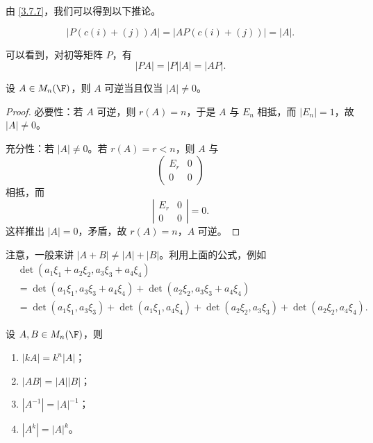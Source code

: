 由 \ref{3.7.7}，我们可以得到以下推论。

\begin{corollary}\label{3.7.8}
	\[
	|P(c(i)+(j))A|=|AP(c(i)+(j))|=|A|.
	\]
\end{corollary}

可以看到，对初等矩阵 $P$，有
\[
|PA|=|P||A|=|AP|.
\]

\begin{theorem}\label{3.7.9}
	设 $A\in M_n(\F)$，则 $A$ 可逆当且仅当 $|A|\neq0$。
\end{theorem}

\begin{proof}
	必要性：若 $A$ 可逆，则 $r(A)=n$，于是 $A$ 与 $E_n$ 相抵，而 $|E_n|=1$，故 $|A|\neq0$。
	
	充分性：若 $|A|\neq0$。若 $r(A)=r<n$，则 $A$ 与
	\[
	\begin{pmatrix}
		E_r&0\\
		0&0
	\end{pmatrix}
	\]
	相抵，而
	\[
	\left|
	\begin{matrix}
		E_r&0\\
		0&0
	\end{matrix}
	\right|=0.
	\]
	这样推出 $|A|=0$，矛盾，故 $r(A)=n$，$A$ 可逆。
\end{proof}

注意，一般来讲 $|A+B|\neq |A|+|B|$。利用上面的公式，例如
\[
\begin{aligned}
	&\det(a_1\xi_1+a_2\xi_2,
	a_3\xi_3+a_4\xi_4)\\
	&=\det(a_1\xi_1,
	a_3\xi_3+a_4\xi_4)
	+\det(a_2\xi_2,
	a_3\xi_3+a_4\xi_4)\\
	&=\det(a_1\xi_1,a_3\xi_3)
	+\det(a_1\xi_1,a_4\xi_4)
	+\det(a_2\xi_2,a_3\xi_3)
	+\det(a_2\xi_2,a_4\xi_4).
\end{aligned}
\]

\begin{proposition}\label{3.7.10}
	设 $A,B\in M_n(\F)$，则
	\begin{enumerate}
		\item $|kA|=k^n|A|$；
		\item $|AB|=|A||B|$；
		\item $|A^{-1}|=|A|^{-1}$；
		\item $|A^k|=|A|^k$。
	\end{enumerate}
\end{proposition}

